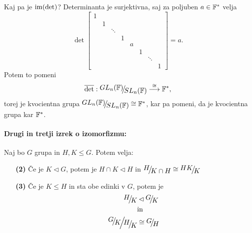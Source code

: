 \begin{zgled}
	\ni Kaj pa je $\operatorname{im} (\det)$? Determinanta je surjektivna, saj za poljuben $a \in \mathbb{F}^*$ velja
	\[
		\det\begin{bmatrix}
			1 &   &        &   &   &   &        &  \\
			  & 1 &        &   &   &   &        &  \\
			  &   & \ddots &   &   &   &        &  \\
			  &   &        & 1 &   &   &        &  \\
			  &   &        &   & a &   &        &  \\
			  &   &        &   &   & 1 &        &  \\
			  &   &        &   &   &   & \ddots &  \\
			  &   &        &   &   &   &        & 1
		\end{bmatrix} = a.
	\]
	Potem to pomeni
	\[
		\overline{\det}: \quot{GL_n(\F)}{SL_n(\F)} \stackrel{\cong}{\longrightarrow} \F^*,
	\]
	torej je kvocientna grupa $\quot{GL_n(\F)}{SL_n(\F)} \cong \F^*$, kar pa pomeni, da je kvocientna
	grupa kar $\mathbb{F}^*$. 
\end{zgled}

\begin{trditev}
	\paragraph{Drugi in tretji izrek o izomorfizmu:}
	Naj bo $G$ grupa in $H, K \leq G$. Potem velja:
	\begin{itemize}
		\item[{\bf (2)}]{\v Ce je $K \lhd G$, potem je $H \cap K \lhd H$ in $\quot{H}{K\cap H} \cong \quot{HK}{K}$}
		\item[{\bf (3)}]{\v Ce je $K \leq H$ in sta obe edinki v $G$, potem je
			\begin{align*}
				\quot{H}{K} &\lhd \quot{G}{K} \\
				&\text{in} \\
				\Quot{G}{K}{H}{K} &\cong \quot{G}{H}
			\end{align*}}
	\end{itemize}
\end{trditev}

